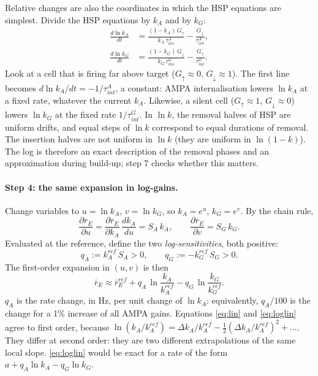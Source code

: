 \documentclass[11pt]{article}
\newcommand{\kA}{k_A}
\newcommand{\kG}{k_G}
\begin{document}
Relative changes are also the coordinates in which the HSP equations are simplest. Divide the HSP equations by $\kA$
and by $\kG$:
\begin{align*}
\frac{d\ln\kA}{dt} &= \frac{(1-\kA)\,G_\uparrow}{\kA\,\tau^{A}_{ins}} - \frac{G_\downarrow}{\tau^{A}_{int}},\\
\frac{d\ln\kG}{dt} &= \frac{(1-\kG)\,G_\downarrow}{\kG\,\tau^{G}_{ins}} - \frac{G_\uparrow}{\tau^{G}_{int}}.
\end{align*}
Look at a cell that is firing far above target ($G_\uparrow\approx0$, $G_\downarrow\approx1$). The first line becomes
$d\ln\kA/dt = -1/\tau^A_{int}$, a constant: AMPA internalisation lowers $\ln\kA$ at a fixed rate, whatever the current
$\kA$. Likewise, a silent cell ($G_\uparrow\approx1$, $G_\downarrow\approx0$) lowers $\ln\kG$ at the fixed rate
$1/\tau^G_{int}$. In $\ln k$, the removal halves of HSP are uniform drifts, and equal steps of $\ln k$ correspond to equal
durations of removal. The insertion halves are not uniform in $\ln k$ (they are uniform in $\ln(1-k)$). The log is
therefore an exact description of the removal phases and an approximation during build-up; step 7 checks whether this
matters.

\paragraph{Step 4: the same expansion in log-gains.}
Change variables to $u=\ln\kA$, $v=\ln\kG$, so $\kA=e^u$, $\kG=e^v$. By the chain rule,
\[
\frac{\partial\bar r_E}{\partial u} = \frac{\partial\bar r_E}{\partial\kA}\,\frac{d\kA}{du} = S_A\,\kA,\qquad
\frac{\partial\bar r_E}{\partial v} = S_G\,\kG .
\]
Evaluated at the reference, define the two \emph{log-sensitivities}, both positive:
\begin{equation}
q_A := \kA^{ref}\,S_A > 0,\qquad q_G := -\kG^{ref}\,S_G > 0 .
\end{equation}
The first-order expansion in $(u,v)$ is then
\begin{equation}
\bar r_E \approx \bar r_E^{ref} + q_A\,\ln\frac{\kA}{\kA^{ref}} - q_G\,\ln\frac{\kG}{\kG^{ref}} .
\label{eq:loglin}\end{equation}
$q_A$ is the rate change, in Hz, per unit change of $\ln\kA$; equivalently, $q_A/100$ is the change for a 1\% increase of
all AMPA gains. Equations \eqref{eq:lin} and \eqref{eq:loglin} agree to first order, because
$\ln(\kA/\kA^{ref}) = \Delta\kA/\kA^{ref} - \tfrac12(\Delta\kA/\kA^{ref})^2+\dots$. They differ at second order: they are
two different extrapolations of the same local slope. \eqref{eq:loglin} would be exact for a rate of the form
$a + q_A\ln\kA - q_G\ln\kG$.
\end{document}
